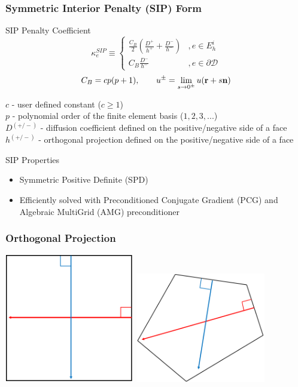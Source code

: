 \documentclass[compress,10pt]{beamer}
\begin{document}
\begin{frame}[t]\frametitle{Symmetric Interior Penalty (SIP) Form}
\begin{block}{SIP Penalty Coefficient}{
	\begin{equation*}
		\kappa_e^{SIP} \equiv 
		\begin{cases}
		\frac{C_B}{2} \left(  \frac{D^+}{h^+} + \frac{D^-}{h^-}  \right) & , e \in E_h^i \\
		C_B \frac{D^-}{h^-}  & , e \in \partial \mathcal{D}
		\end{cases}
	\end{equation*}}
	\begin{equation*}
		C_B = c p (p+1), \qquad u^{\pm} = \lim_{s \rightarrow 0^{\pm}} u ({\bf r} + s {\bf n})
	\end{equation*}


$c$ - user defined constant ($c \geq 1$) \\
$p$ - polynomial order of the finite element basis ($1,2,3,...$) \\
$D^{(+/-)}$ - diffusion coefficient defined on the positive/negative side of a face\\
$h^{(+/-)}$ - orthogonal projection defined on the positive/negative side of a face
\end{block}
\begin{block}{SIP Properties}
\begin{itemize}
\item Symmetric Positive Definite (SPD)
\item Efficiently solved with Preconditioned Conjugate Gradient (PCG) and Algebraic MultiGrid (AMG) preconditioner
\end{itemize}
\end{block}
\end{frame}
\begin{frame}[t]
\frametitle{Orthogonal Projection}
\vspace{1cm}
{}\includegraphics[width=0.425\textwidth]{images/Orth_proj_square.png} \hfill
{}\includegraphics[width=0.425\textwidth]{images/Orth_proj_pentagon.png}
\end{frame}
\end{document}
